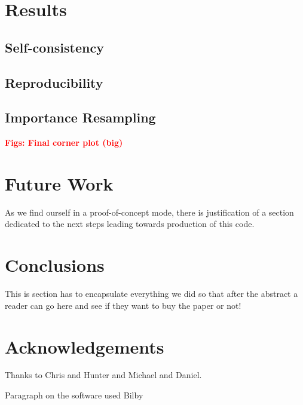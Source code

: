\documentclass[prd,superscriptaddress,twocolumn,nopreprintnumbers,floatfix]{revtex4}
\newcommand{\bilby}{{\sc Bilby}\xspace}
\begin{document}
\section{Results}\label{results}

\subsection{Self-consistency}

\subsection{Reproducibility}

\subsection{Importance Resampling}


\textbf{\textcolor{red}{Figs: Final corner plot (big)}}


\section{Future Work}\label{future}

As we find ourself in a proof-of-concept mode, there is justification of a section dedicated to the next steps leading towards production of this code.

\section{Conclusions}\label{conc}

This is section has to encapsulate everything we did so that after the abstract a reader can go here and see if they want to buy the paper or not!

\section{Acknowledgements}

Thanks to Chris and Hunter and Michael and Daniel.

Paragraph on the software used \bilby\cite{bilby} 
\clearpage

\end{document}
